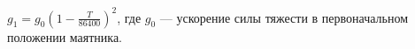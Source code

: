 $g_{1}=g_{0}\left(1-\frac{T}{86 400}\right)^2$, где $g_{0}$ ---
ускорение
силы тяжести в первоначальном положении маятника.

